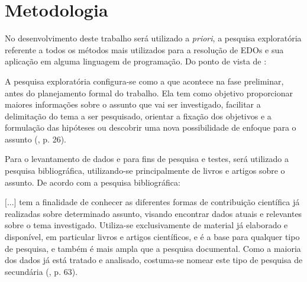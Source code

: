 \section{Metodologia}\label{lmetodologia}

No desenvolvimento deste trabalho será utilizado a \emph{priori}, a pesquisa 
exploratória referente a todos os métodos mais utilizados para a 
resolução de EDOs e sua aplicação em alguma linguagem de programação. 
Do ponto de vista de : 
\begin{citacao}  
A pesquisa exploratória configura-se como a que acontece na fase 
preliminar, antes do planejamento formal do trabalho. Ela tem como 
objetivo proporcionar maiores informações sobre o assunto que vai ser 
investigado, facilitar a delimitação do tema a ser pesquisado, orientar 
a fixação dos objetivos e a formulação das hipóteses ou descobrir uma 
nova possibilidade de enfoque para o assunto (\citeyear{prestes}, p. 26).
\end{citacao}
Para o levantamento de dados e para fins de pesquisa e testes, será utilizado 
a pesquisa bibliográfica, utilizando-se principalmente de livros e
artigos sobre o assunto. De acordo com  a pesquisa
bibliográfica:
\begin{citacao}
$[$...$]$ tem a finalidade de conhecer as diferentes formas de 
contribuição científica já realizadas sobre determinado assunto, 
visando encontrar dados atuais e relevantes sobre o tema investigado. 
Utiliza-se exclusivamente de material já elaborado e disponível, em 
particular livros e artigos científicos, e é a base para qualquer tipo 
de pesquisa, e também é mais ampla que a pesquisa documental. Como a 
maioria dos dados já está tratado e analisado, costuma-se nomear este 
tipo de pesquisa de secundária (\citeyear{metring}, p. 63).
\end{citacao}
